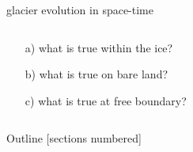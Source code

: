 \documentclass[10pt,dvipsnames]{beamer}
\theoremstyle{theorem}
\begin{document}
\begin{frame}{glacier evolution in space-time }

\bigskip \bigskip

\begin{columns}
\begin{column}{0.28\textwidth}
\begin{itemize}
\item[a)] what is true within the {\color{RoyalBlue} ice}?
\item[b)] what is true on {\color{OliveGreen} bare land}?
\item[c)] what is true at {\color{Salmon} free boundary}?
\end{itemize}\end{column}
\begin{column}{0.72\textwidth}
\end{column}
\end{columns}
\end{frame}


\begin{frame}{Outline}
  [sections numbered]
  \tableofcontents[hideallsubsections]
\end{frame}
\end{document}
